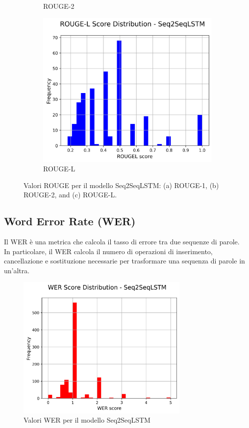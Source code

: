 \documentclass[a4paper, 12pt]{article}
\begin{document}
\begin{figure}[H]
\begin{subfigure}{0.32\textwidth}
        \caption{ROUGE-2}
        \label{fig:rouge_2}
    \end{subfigure}
    \hfill
    \begin{subfigure}{0.32\textwidth}
        \centering
        \includegraphics[width=\textwidth]{media/Seq2SeqLSTM_rougeL_scores.png}
        \caption{ROUGE-L}
        \label{fig:rouge_l}
    \end{subfigure}
    \caption{Valori ROUGE per il modello Seq2SeqLSTM: (a) ROUGE-1, (b) ROUGE-2, and (c) ROUGE-L.}
    \label{fig:rouge_scores}
\end{figure}


\subsection{Word Error Rate (WER)}
Il WER è una metrica che calcola il tasso di errore tra due sequenze di parole.\\
In particolare, il WER calcola il numero di operazioni di inserimento, cancellazione e sostituzione necessarie per trasformare una sequenza di parole in un'altra.\\
\begin{figure}[H]
    \centering
    \includegraphics[width=0.75\textwidth]{media/Seq2SeqLSTM_wer_scores.png}
    \caption{Valori WER per il modello Seq2SeqLSTM}
    \label{fig:wer}
\end{figure}
\end{document}
